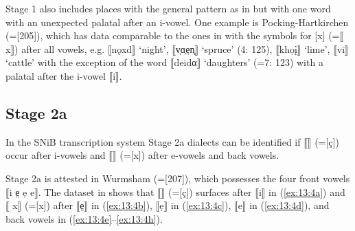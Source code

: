Stage 1 also includes places with the general pattern as in  but with one word with an unexpected palatal after an i-vowel. One example is Pocking-Hartkirchen (=[205]), which has data comparable to the ones in  with the symbols for [x] (=⟦ x⟧) after all vowels, e.g. ⟦nǫxd⟧ ‘night’, ⟦v̩ɑ̣e̤n̥⟧ ‘spruce’ (4: 125), ⟦khọ\k{i}⟧ ‘lime’, ⟦vī⟧ ‘cattle’ with the exception of the word ⟦deidα⟧ ‘daughters’ (=7: 123) with a palatal after the i-vowel ⟦i⟧.

\subsection{Stage 2a}\label{sec:13.3.2}

In the SNiB transcription system Stage 2a dialects can be identified if ⟦⟧ (=[ç]) occur after i-vowels and ⟦⟧ (=[x]) after e-vowels and back vowels.  

Stage 2a is attested in Wurmsham (=[207]), which possesses the four front vowels ⟦i e̤ ẹ e⟧. The dataset in  shows that ⟦⟧ (=[ç]) surfaces after ⟦i⟧ in (\ref{ex:13:4a}) and ⟦ x⟧ (=[x]) after ⟦e̤⟧ in (\ref{ex:13:4b}), ⟦ẹ⟧ in (\ref{ex:13:4c}), ⟦e⟧ in (\ref{ex:13:4d}), and back vowels in (\ref{ex:13:4e}--\ref{ex:13:4h}).

